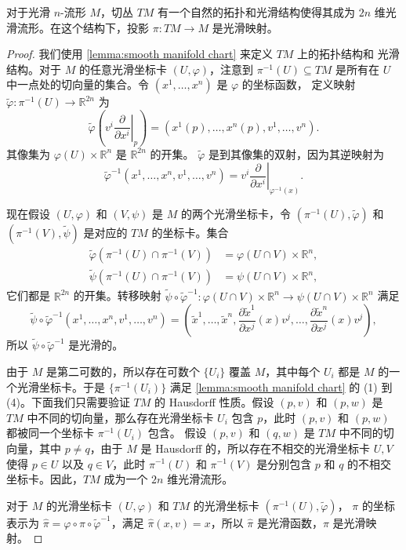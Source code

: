 \documentclass[fontset=none]{Notes}
\begin{document}
\begin{proposition}\label{prop:smooth structure of tangent bundle}
  对于光滑 $n$-流形 $M$，切丛 $TM$ 有一个自然的拓扑和光滑结构使得其成为
  $2n$ 维光滑流形。在这个结构下，投影 $\pi:TM\to M$ 是光滑映射。
\end{proposition}
\begin{proof}
  我们使用 \autoref{lemma:smooth manifold chart} 来定义 $TM$ 上的拓扑结构和
  光滑结构。对于 $M$ 的任意光滑坐标卡 $(U,\varphi)$，注意到 $\pi^{-1}(U)\subseteq TM$
  是所有在 $U$ 中一点处的切向量的集合。令 $(x^1,\dots,x^n)$ 是 $\varphi$ 的坐标函数，
  定义映射 $\tilde{\varphi}:\pi^{-1}(U)\to\mathbb{R}^{2n}$ 为
  \begin{equation}\label{eq:coordinate of TM}
    \tilde{\varphi}\left(
      v^i\!\left.\frac{\partial}{\partial x^i}\right|_p
    \right)  =\left(x^1(p),\dots,x^n(p),v^1,\dots,v^n\right).
  \end{equation}
  其像集为 $\varphi(U)\times\mathbb{R}^n$ 是 $\mathbb{R}^{2n}$ 的开集。
  $\tilde{\varphi}$ 是到其像集的双射，因为其逆映射为
  \[
    \tilde{\varphi}^{-1} \left(x^1,\dots,x^n,v^1,\dots,v^n\right)
    =v^i\!\left.\frac{\partial}{\partial x^i}\right|_{\varphi^{-1}(x)}.
  \]

  现在假设 $(U,\varphi)$ 和 $(V,\psi)$ 是 $M$ 的两个光滑坐标卡，令
  $\left(\pi^{-1}(U),\tilde{\varphi}\right)$ 和 $\left(\pi^{-1}(V),\tilde{\psi}\right)$
  是对应的 $TM$ 的坐标卡。集合
  \begin{align*}
    \tilde{\varphi}\left(\pi^{-1}(U)\cap\pi^{-1}(V)\right)&=
    \varphi(U\cap V)\times\mathbb{R}^n,\\
    \tilde{\psi}\left(\pi^{-1}(U)\cap\pi^{-1}(V)\right)&=
    \psi(U\cap V)\times\mathbb{R}^n,
  \end{align*}
  它们都是 $\mathbb{R}^{2n}$ 的开集。转移映射 $\tilde{\psi}\circ\tilde{\varphi}^{-1}:{\varphi}(U\cap V)\times\mathbb{R}^n\to\psi(U\cap V)\times\mathbb{R}^n$
  满足
  \[
    \tilde{\psi}\circ\tilde{\varphi}^{-1}\left(x^1,\dots,x^n,v^1,\dots,v^n\right)
    =\left(
      \tilde{x}^1,\dots,\tilde{x}^n,
      \frac{\partial\tilde{x}^1}{\partial x^j}(x)v^j,\dots,
      \frac{\partial\tilde{x}^n}{\partial x^j}(x)v^j
    \right),
  \]
  所以 $\tilde{\psi}\circ\tilde{\varphi}^{-1}$ 是光滑的。

  由于 $M$ 是第二可数的，所以存在可数个 $\{U_i\}$ 覆盖 $M$，其中每个 $U_i$
  都是 $M$ 的一个光滑坐标卡。于是 $\{\pi^{-1}(U_i)\}$ 满足 \autoref{lemma:smooth manifold chart}
  的 (1) 到 (4)。下面我们只需要验证 $TM$ 的 Hausdorff 性质。假设 $(p,v)$ 和 $(p,w)$
  是 $TM$ 中不同的切向量，那么存在光滑坐标卡 $U_i$ 包含 $p$，此时
  $(p,v)$ 和 $(p,w)$ 都被同一个坐标卡 $\pi^{-1}(U_i)$ 包含。
  假设 $(p,v)$ 和 $(q,w)$ 是 $TM$ 中不同的切向量，其中 $p\neq q$，由于
  $M$ 是 Hausdorff 的，所以存在不相交的光滑坐标卡 $U,V$ 使得
  $p\in U$ 以及 $q\in V$，此时 $\pi^{-1}(U)$ 和 $\pi^{-1}(V)$
  是分别包含 $p$ 和 $q$ 的不相交坐标卡。因此，$TM$ 成为一个 $2n$ 维光滑流形。

  对于 $M$ 的光滑坐标卡 $(U,\varphi)$ 和 $TM$ 的光滑坐标卡 $\left(\pi^{-1}(U),\tilde{\varphi}\right)$，
  $\pi$ 的坐标表示为 $\hat\pi=\varphi\circ\pi\circ\tilde{\varphi}^{-1}$，满足
  $\hat\pi(x,v)=x$，所以 $\hat \pi$ 是光滑函数，$\pi$ 是光滑映射。
\end{proof}
\end{document}
